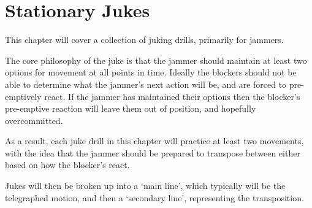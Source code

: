 \section{Stationary Jukes}

This chapter will cover a collection of juking drills, primarily for jammers.


The core philosophy of the juke is that the jammer should maintain at least two options for movement at all points in time.  
Ideally the blockers should not be able to determine what the jammer's next action will be, and are forced to pre-emptively react.    
If the jammer has maintained their options then the blocker's pre-emptive reaction will leave them out of position, and hopefully overcommitted.  


As a result, each juke drill in this chapter will practice at least two movements, with the idea that the jammer should be prepared to transpose between either based on how the blocker's react.

Jukes will then be broken up into a `main line', which typically will be the telegraphed motion, and then a `secondary line', representing the transposition.    
